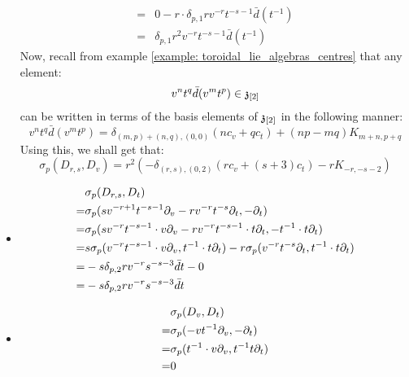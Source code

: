 \begin{example}
\begin{itemize}
$$\begin{aligned}
                            \\
                            = & 0 - r \cdot \delta_{p, 1}r v^{-r} t^{-s - 1} \bar{d}(t^{-1})
                            \\
                            = & \delta_{p, 1} r^2 v^{-r} t^{-s - 1} \bar{d}(t^{-1})
                        \end{aligned}
                    $$
                Now, recall from example \ref{example: toroidal_lie_algebras_centres} that any element:
                    $$v^n t^q \bar{d}(v^m t^p) \in \mathfrak{z}_{[2]}$$
                can be written in terms of the basis elements of $\mathfrak{z}_{[2]}$ in the following manner:
                    $$v^n t^q \bar{d}(v^m t^p) = \delta_{(m, p) + (n, q), (0, 0)} ( n c_v + q c_t ) + (np - mq) K_{m + n, p + q}$$
                Using this, we shall get that:
                    $$\sigma_p(D_{r, s}, D_v) = r^2 \left( -\delta_{(r, s), (0, 2)} ( r c_v + (s + 3) c_t ) - r K_{-r, -s - 2} \right)$$
                \item
                    $$
                        \begin{aligned}
                            & \sigma_p(D_{r, s}, D_t)
                            \\
                            = & \sigma_p( s v^{-r + 1} t^{-s - 1} \partial_v - r v^{-r} t^{-s} \partial_t, -\partial_t )
                            \\
                            = & \sigma_p( s v^{-r} t^{-s - 1} \cdot v \partial_v - r v^{-r} t^{-s - 1} \cdot t \partial_t, -t^{-1} \cdot t\partial_t )
                            \\
                            = & s \sigma_p( v^{-r} t^{-s - 1} \cdot v \partial_v, t^{-1} \cdot t\partial_t ) - r\sigma_p( v^{-r} t^{-s} \partial_t, t^{-1} \cdot t\partial_t )
                            \\
                            = & -s \delta_{p, 2} r v^{-r} s^{-s - 3} \bar{d}t - 0
                            \\
                            = & -s \delta_{p, 2} r v^{-r} s^{-s - 3} \bar{d}t
                        \end{aligned}
                    $$
                \item
                    $$
                        \begin{aligned}
                            & \sigma_p(D_v, D_t)
                            \\
                            = & \sigma_p(-v t^{-1} \partial_v, -\partial_t)
                            \\
                            = & \sigma_p(t^{-1} \cdot v \partial_v, t^{-1} t \partial_t)
                            \\
                            = & 0
                        \end{aligned}
                    $$
            \end{itemize}


\end{example}
